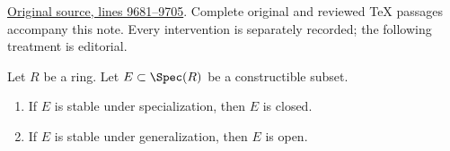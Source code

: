\noindent\href{https://github.com/stacks/stacks-project/blob/a04446e57ec1fbc252a871afcec7752fb2807b14/algebra.tex\#L9681}{Original source, lines 9681--9705}. Complete original and reviewed TeX passages accompany this note. Every intervention is separately recorded; the following treatment is editorial.


\begin{lemma}
\label{editorial-source-lemma-constructible-stable-specialization-closed}
Let $R$ be a ring. Let $E \subset \Spec(R)$ be a constructible subset.
\begin{enumerate}
\item If $E$ is stable under specialization, then $E$ is closed.
\item If $E$ is stable under generalization, then $E$ is open.
\end{enumerate}
\end{lemma}

